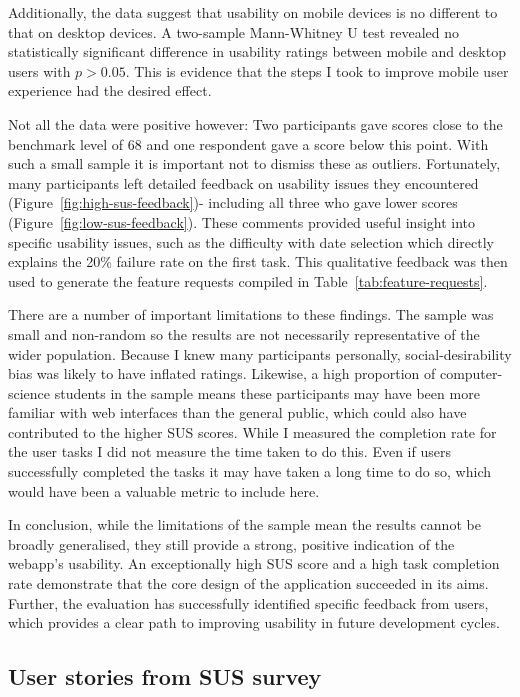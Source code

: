 Additionally, the data suggest that usability on mobile devices is no different
to that on desktop devices. A two-sample Mann-Whitney U test revealed no
statistically significant difference in usability ratings between mobile and
desktop users with \(p>0.05\). This is evidence that the steps I took to improve
mobile user experience had the desired effect.

Not all the data were positive however: Two participants gave scores close to
the benchmark level of 68 and one respondent gave a score below this point. With
such a small sample it is important not to dismiss these as outliers.
Fortunately, many participants left detailed feedback on usability issues they
encountered (Figure~\ref{fig:high-sus-feedback})- including all three who gave
lower scores (Figure~\ref{fig:low-sus-feedback}). These comments provided useful
insight into specific usability issues, such as the difficulty with date
selection which directly explains the 20\% failure rate on the first task. This
qualitative feedback was then used to generate the feature requests compiled in
Table~\ref{tab:feature-requests}.

There are a number of important limitations to these findings. The sample was
small and non-random so the results are not necessarily representative of the
wider population. Because I knew many participants personally,
social-desirability bias was likely to have inflated ratings. Likewise, a high
proportion of computer-science students in the sample means these participants
may have been more familiar with web interfaces than the general public, which
could also have contributed to the higher SUS scores. While I measured the
completion rate for the user tasks I did not measure the time taken to do this.
Even if users successfully completed the tasks it may have taken a long time to
do so, which would have been a valuable metric to include here.

In conclusion, while the limitations of the sample mean the results cannot be
broadly generalised, they still provide a strong, positive indication of the
webapp's usability. An exceptionally high SUS score and a high task completion
rate demonstrate that the core design of the application succeeded in its aims.
Further, the evaluation has successfully identified specific feedback from
users, which provides a clear path to improving usability in future development
cycles.

\subsection{User stories from SUS survey} \label{sec:user-story}

